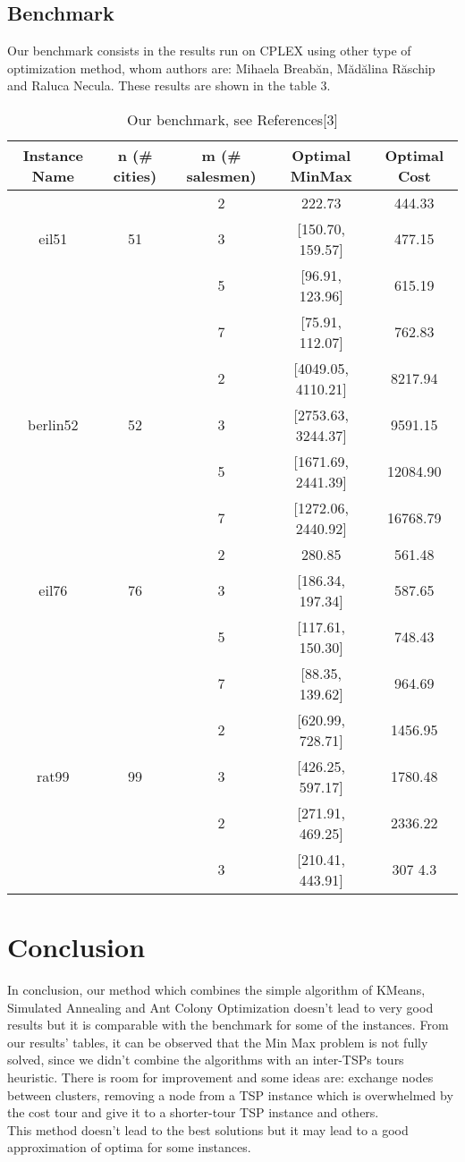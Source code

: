 \documentclass{article}
\begin{document}
\subsection{Benchmark}
Our benchmark consists in the results run on CPLEX using other type of optimization method, whom authors are: Mihaela Breabăn, Mădălina Răschip and Raluca Necula. These results are shown in the table 3.

\begin{table}[h!]
\centering
\begin{tabular}{ |c|c|c|c|c| } 
\hline
Instance Name & n (\# cities) & m (\# salesmen) & Optimal MinMax & Optimal Cost\\
\hline
 &   & 2 & 222.73 & 444.33 \\ 
eil51  & 51 & 3 & [150.70, 159.57] & 477.15 \\ 
  &   & 5 & [96.91, 123.96] & 615.19 \\ 
  &   & 7 & [75.91, 112.07] & 762.83 \\ 
\hline
  &   & 2 & [4049.05, 4110.21] & 8217.94 \\ 
berlin52 & 52 & 3 & [2753.63, 3244.37] & 9591.15 \\ 
  &   & 5 & [1671.69, 2441.39] & 12084.90 \\ 
  &   & 7 & [1272.06, 2440.92] & 16768.79 \\ 
\hline
  &   & 2 & 280.85 & 561.48 \\ 
eil76 & 76 & 3 & [186.34, 197.34] & 587.65 \\ 
  &   & 5 & [117.61, 150.30] & 748.43 \\ 
  &   & 7 & [88.35, 139.62] & 964.69 \\ 
\hline
  &   & 2 & [620.99, 728.71] & 1456.95 \\ 
rat99 & 99 & 3 & [426.25, 597.17] & 1780.48  \\ 
  &   & 2 & [271.91, 469.25] & 2336.22 \\ 
  &   & 3 & [210.41, 443.91] & 307
  4.3 \\ 
\hline
\end{tabular}
\caption{Our benchmark, see References[3]}
\label{table:3}
\end{table}

\FloatBarrier

\section{Conclusion}
In conclusion, our method which combines the simple algorithm of KMeans, Simulated Annealing and Ant Colony Optimization doesn't lead to very good results but it is comparable with the benchmark for some of the instances. From our results' tables, it can be observed that the Min Max problem is not fully solved, since we didn't combine the algorithms with an inter-TSPs tours heuristic. There is room for improvement and some ideas are: exchange nodes between clusters, removing a node from a TSP instance which is overwhelmed by the cost tour and give it to a shorter-tour TSP instance and others.\\
This method doesn't lead to the best solutions but it may lead to a good approximation of optima for some instances.
\end{document}
